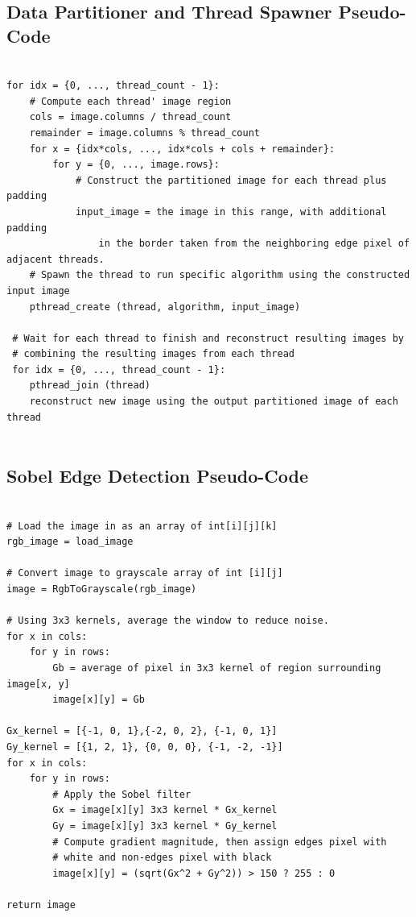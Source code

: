 \documentclass{article}
\begin{document}
    \subsection{Data Partitioner and Thread Spawner Pseudo-Code}
        \begin{lstlisting}[basicstyle=\footnotesize]
        
for idx = {0, ..., thread_count - 1}:
    # Compute each thread' image region
    cols = image.columns / thread_count
    remainder = image.columns % thread_count
    for x = {idx*cols, ..., idx*cols + cols + remainder}:
        for y = {0, ..., image.rows}:
            # Construct the partitioned image for each thread plus padding
            input_image = the image in this range, with additional padding 
                in the border taken from the neighboring edge pixel of adjacent threads.
    # Spawn the thread to run specific algorithm using the constructed input image
    pthread_create (thread, algorithm, input_image)
 
 # Wait for each thread to finish and reconstruct resulting images by 
 # combining the resulting images from each thread
 for idx = {0, ..., thread_count - 1}:
    pthread_join (thread)
    reconstruct new image using the output partitioned image of each thread
    
        \end{lstlisting}
    
    \subsection{Sobel Edge Detection Pseudo-Code}
        \begin{lstlisting}[basicstyle=\footnotesize]

# Load the image in as an array of int[i][j][k]
rgb_image = load_image

# Convert image to grayscale array of int [i][j]
image = RgbToGrayscale(rgb_image)

# Using 3x3 kernels, average the window to reduce noise.
for x in cols:
    for y in rows: 
        Gb = average of pixel in 3x3 kernel of region surrounding image[x, y]
        image[x][y] = Gb
        
Gx_kernel = [{-1, 0, 1},{-2, 0, 2}, {-1, 0, 1}]
Gy_kernel = [{1, 2, 1}, {0, 0, 0}, {-1, -2, -1}]
for x in cols:
    for y in rows:
        # Apply the Sobel filter
        Gx = image[x][y] 3x3 kernel * Gx_kernel
        Gy = image[x][y] 3x3 kernel * Gy_kernel
        # Compute gradient magnitude, then assign edges pixel with 
        # white and non-edges pixel with black
        image[x][y] = (sqrt(Gx^2 + Gy^2)) > 150 ? 255 : 0
        
return image
        \end{lstlisting}
        
\end{document}
